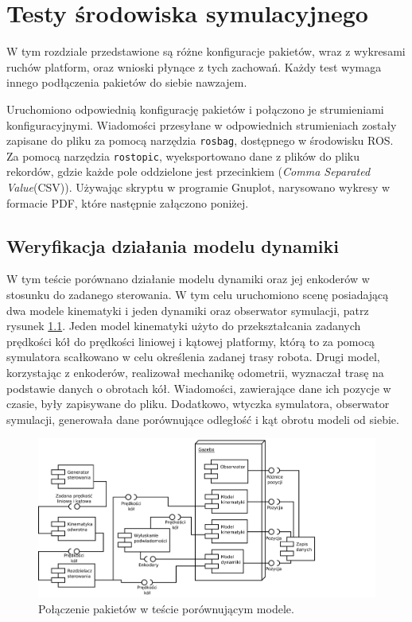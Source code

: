 \chapter{Testy środowiska symulacyjnego}
\label{sec:tests}
W tym rozdziale przedstawione są różne konfiguracje pakietów, wraz z wykresami ruchów platform, oraz wnioski płynące z tych zachowań.
Każdy test wymaga innego podłączenia pakietów do siebie nawzajem.

Uruchomiono odpowiednią konfigurację pakietów i połączono je strumieniami konfiguracyjnymi.
Wiadomości przesyłane w odpowiednich strumieniach zostały zapisane do pliku za pomocą narzędzia
\texttt{rosbag}, dostępnego w środowisku ROS.
Za pomocą narzędzia \texttt{rostopic}, wyeksportowano dane z plików do pliku rekordów, gdzie każde pole oddzielone jest przecinkiem (\emph{Comma Separated Value}(CSV)).
Używając skryptu w programie Gnuplot, narysowano wykresy w formacie PDF, które następnie załączono poniżej.

\section{Weryfikacja działania modelu dynamiki}
	W tym teście porównano działanie modelu dynamiki oraz jej enkoderów w stosunku do zadanego sterowania.
	W tym celu uruchomiono scenę posiadającą dwa modele kinematyki i jeden dynamiki oraz obserwator symulacji, patrz rysunek \ref{uml:comparison}.
	Jeden model kinematyki użyto do przekształcania zadanych prędkości kół do prędkości liniowej i kątowej platformy, którą to za pomocą symulatora scałkowano w celu określenia zadanej trasy robota. Drugi model, korzystając z enkoderów, realizował mechanikę odometrii, wyznaczał trasę na podstawie danych o obrotach kół.
	Wiadomości, zawierające dane ich pozycje w czasie, były zapisywane do pliku.
	Dodatkowo, wtyczka symulatora, obserwator symulacji, generowała dane porównujące odległość i kąt obrotu modeli od siebie.
	
	\begin{figure}[h]
		\centering
		\includegraphics[width=\textwidth]{uml/comparison.pdf}
			\caption{Połączenie pakietów w teście porównującym modele.}
		\label{uml:comparison}
	\end{figure}
	
